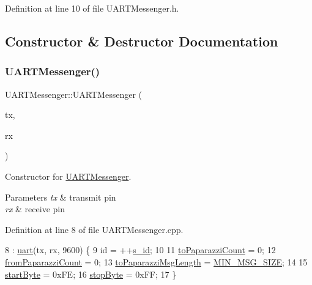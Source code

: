 Definition at line 10 of file U\+A\+R\+T\+Messenger.\+h.



\subsection{Constructor \& Destructor Documentation}
\mbox{\label{class_u_a_r_t_messenger_a2fcc2d4308e961996cf3dd120f297112}} 
\subsubsection{\texorpdfstring{U\+A\+R\+T\+Messenger()}{UARTMessenger()}}
{\footnotesize\ttfamily U\+A\+R\+T\+Messenger\+::\+U\+A\+R\+T\+Messenger (\begin{DoxyParamCaption}\item[{Pin\+Name}]{tx,  }\item[{Pin\+Name}]{rx }\end{DoxyParamCaption})}



Constructor for \hyperlink{class_u_a_r_t_messenger}{U\+A\+R\+T\+Messenger}. 


\begin{DoxyParams}{Parameters}
{\em tx} & transmit pin \\
\hline
{\em rx} & receive pin \\
\hline
\end{DoxyParams}


Definition at line 8 of file U\+A\+R\+T\+Messenger.\+cpp.


\begin{DoxyCode}
8                                                    : \hyperlink{class_u_a_r_t_messenger_aabc5283b509be4ce8335bbb2513e9b4c}{uart}(tx, rx, 9600) \{
9     \textcolor{keywordtype}{id} = ++\hyperlink{class_abstract_component_a99ce3e5fe7d73dac569b874c15fcaf0d}{s\_id};
10 
11     \hyperlink{class_u_a_r_t_messenger_ae47f334cdd266ae4cde0715154f0ace3}{toPaparazziCount} = 0;
12     \hyperlink{class_u_a_r_t_messenger_a72ecf1c51d6a28c582fff9fd454145dd}{fromPaparazziCount} = 0;
13     \hyperlink{class_u_a_r_t_messenger_ae2a77be89a1f84b466eab4753929b902}{toPaparazziMsgLength} = \hyperlink{_u_a_r_t_messenger_8h_a03caf75f3be11c473c11ea925cef73e2}{MIN\_MSG\_SIZE};
14 
15     \hyperlink{class_u_a_r_t_messenger_abfc75506508a4d627236fc61f0f536b2}{startByte} = 0xFE;
16     \hyperlink{class_u_a_r_t_messenger_abd1f0ee480db317c51ea633fff5dd9af}{stopByte} = 0xFF;
17 \}
\end{DoxyCode}


